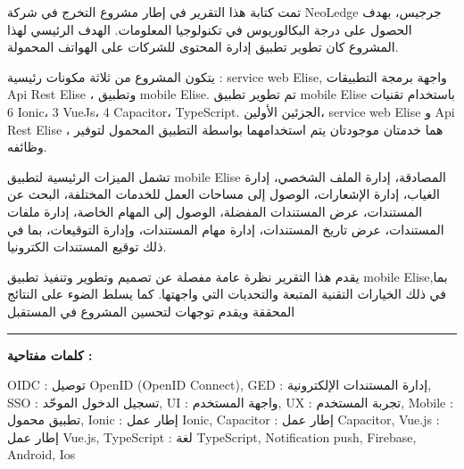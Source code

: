 \begin{Arabic}  تمت كتابة هذا التقرير في إطار مشروع التخرج في شركة NeoLedge جرجيس، بهدف الحصول على درجة البكالوريوس في تكنولوجيا المعلومات. الهدف الرئيسي لهذا المشروع كان تطوير تطبيق إدارة المحتوى للشركات على الهواتف المحمولة.

يتكون المشروع من ثلاثة مكونات رئيسية : service web Elise, واجهة برمجة التطبيقات Api Rest Elise ، وتطبيق mobile Elise. تم تطوير تطبيق mobile Elise باستخدام تقنيات 6 Ionic، 3 VueJs، 4 Capacitor، TypeScript. الجزئين الأولين، service web Elise و Api Rest Elise ، هما خدمتان موجودتان يتم استخدامهما بواسطة التطبيق المحمول لتوفير وظائفه.

تشمل الميزات الرئيسية لتطبيق mobile Elise المصادقة، إدارة الملف الشخصي، إدارة الغياب، إدارة الإشعارات، الوصول إلى مساحات العمل للخدمات المختلفة، البحث عن المستندات، عرض المستندات المفضلة، الوصول إلى المهام الخاصة، إدارة ملفات المستندات، عرض تاريخ المستندات، إدارة مهام المستندات، وإدارة التوقيعات، بما في ذلك توقيع المستندات الكترونيا.

يقدم هذا التقرير نظرة عامة مفصلة عن تصميم وتطوير وتنفيذ تطبيق mobile Elise,بما في ذلك الخيارات التقنية المتبعة والتحديات التي واجهتها. كما يسلط الضوء على النتائج المحققة ويقدم توجهات لتحسين المشروع في المستقبل
\end{Arabic}

\noindent\rule[2pt]{\textwidth}{0.5pt}


\begin{Arabic}
\textbf{كلمات مفتاحية  :}

OIDC : توصيل OpenID (OpenID Connect), GED : إدارة المستندات الإلكترونية, SSO : تسجيل الدخول الموحّد, UI : واجهة المستخدم, UX : تجربة المستخدم, Mobile : تطبيق محمول, Ionic : إطار عمل Ionic, Capacitor : إطار عمل Capacitor, Vue.js : إطار عمل Vue.js, TypeScript : لغة TypeScript, Notification push, Firebase, Android, Ios
\end{Arabic}


